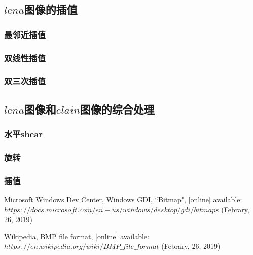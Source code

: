 \documentclass[UTF8]{ctexart}
\begin{document}
\subsection{$lena$图像的插值}

\subsubsection{最邻近插值}

\subsubsection{双线性插值}

\subsubsection{双三次插值}

\subsection{$lena$图像和$elain$图像的综合处理}

\subsubsection{水平shear}

\subsubsection{旋转}

\subsubsection{插值}

\newpage
\begin{thebibliography}{}
     Microsoft Windows Dev Center, 
    Windows GDI, ``Bitmap", [online] available: 
    \newline $https://docs.microsoft.com/en-us/windows/desktop/gdi/bitmaps$  
    (Febrary, 26, 2019)

	 Wikipedia, BMP file format, [online] available: \newline 
	$https://en.wikipedia.org/wiki/BMP\_file\_format$ (Febrary, 26, 2019)

\end{thebibliography}

\clearpage
\end{document}

